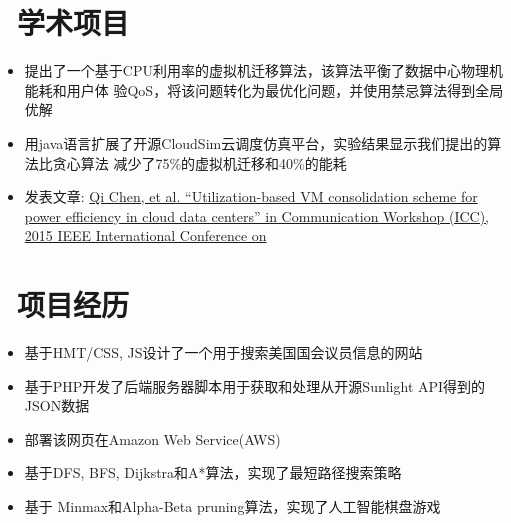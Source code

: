\documentclass{resume}
\begin{document}
\vspace{-3mm}
\section{\faUsers\ 学术项目}
\vspace{-3mm}
\normalsize{
\begin{itemize}
  \item 提出了一个基于CPU利用率的虚拟机迁移算法，该算法平衡了数据中心物理机能耗和用户体 验QoS，将该问题转化为最优化问题，并使用禁忌算法得到全局优解
  \item 用java语言扩展了开源CloudSim云调度仿真平台，实验结果显示我们提出的算法比贪心算法 减少了75\%的虚拟机迁移和40\%的能耗
  \item 发表文章: \href{http://www-scf.usc.edu/~chen147/ICC\%20paper.pdf}{Qi Chen, et al. “Utilization-based VM consolidation scheme for power efficiency in cloud data centers” in Communication Workshop (ICC), 2015 IEEE International Conference on }
\end{itemize}
}

\vspace{-3mm}
\section{\faUsers\ 项目经历}
\begin{itemize}
  \item 基于HMT/CSS, JS设计了一个用于搜索美国国会议员信息的网站
  \item 基于PHP开发了后端服务器脚本用于获取和处理从开源Sunlight API得到的JSON数据
  \item 部署该网页在Amazon Web Service(AWS)
\end{itemize}

\begin{itemize}
  \item 基于DFS, BFS, Dijkstra和A*算法，实现了最短路径搜索策略
   \item 基于 Minmax和Alpha-Beta pruning算法，实现了人工智能棋盘游戏
\end{itemize}
\end{document}
